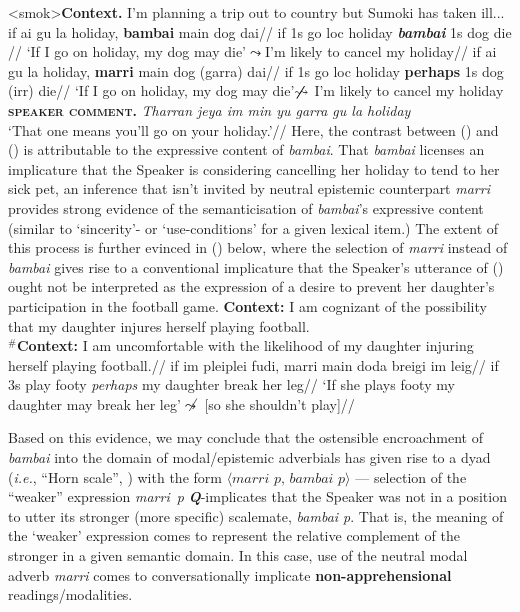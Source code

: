 \pex<smok>\textbf{Context.} I'm planning a trip out to country but Sumoki has taken ill...
\a{}\begingl\gla if ai gu la holiday, \textbf{bambai} main dog dai//
\glb if 1s go {\sc loc} holiday \textit{\textbf{bambai}} 1s dog die //
\glft `If I go on holiday, my dog may die'\hfill$\boldsymbol\leadsto$\hfill I'm likely to cancel my holiday//
\endgl
\a{}\begingl
\gla if ai gu la holiday, \textbf{marri} main dog (garra) dai//
\glb if 1s go {\sc loc} holiday \textbf{perhaps} 1s dog {\sc(irr)} die//
\glft `If I go on holiday, my dog may die'\hfill$\boldsymbol{\not\leadsto}\hfill$ I'm likely to cancel my holiday\\[.2em]
\textsc{\textbf{speaker comment.}} \textit{Tharran jeya im min yu garra gu la holiday}\\`That one means you'll go on your holiday.'\trailingcitation{[AJ 04082017]}//
\endgl
\xe
Here, the contrast between () and () is attributable to the expressive content of \textit{bambai}. That \textit{bambai} licenses an implicature that the Speaker is considering cancelling her holiday to tend to her sick pet, an inference that isn't invited by neutral epistemic counterpart \textit{marri} provides strong evidence of the semanticisation of \textit{bambai}'s expressive content (similar to `sincerity'- or `use-conditions' for a given lexical item.) The extent of this process is further evinced in (\nextx) below, where the selection of \textit{marri} instead of \textit{bambai} gives rise to a conventional implicature that the Speaker's utterance of (\nextx) ought not be interpreted as the expression of a desire to prevent her daughter's participation in the football game.
\pex\begingl
\glpreamble\textbf{Context:} I am cognizant of the possibility that my daughter injures herself playing football.\\\textbf{$^\#$Context:} I am uncomfortable with the likelihood of my daughter injuring herself playing football.//
\gla if im pleiplei fudi, marri main doda breigi im leig//
\glb  if 3s play footy \textsl{perhaps} my daughter break her leg//
\glft `If she plays footy my daughter may break her leg'\hfill$\not\leadsto$ [so she shouldn't play]\trailingcitation{[AJ 04082017]}//
\endgl\xe

Based on this evidence, we may conclude that the ostensible encroachment of \textit{bambai} into the domain of modal/epistemic adverbials has given rise to a dyad (\textit{i.e.}, ``Horn scale'', \citealp{Horn1984}) with the form $\langle\textit{marri~p, bambai~p}\rangle$ --- selection of the ``weaker'' expression \textit{marri~p} \textbf{\textit{Q}}-implicates that the Speaker was not in a position to utter its stronger (more specific) scalemate, \textit{bambai p}. That is, the meaning of the `weaker' expression comes to represent the relative complement of the stronger in a given semantic domain. In this case, use of the neutral modal adverb \textit{marri} comes to conversationally implicate \textbf{non-apprehensional} readings/modalities.


